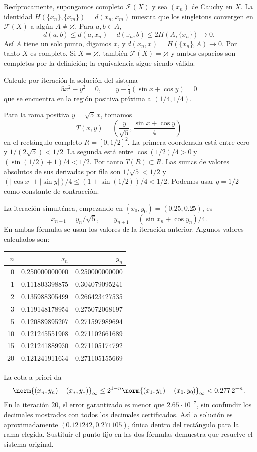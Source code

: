 \begin{solucion}
Recíprocamente, supongamos completo $\mathcal F(X)$ y sea $(x_n)$ de Cauchy en $X$. La identidad $H(\{x_n\},\{x_m\})=d(x_n,x_m)$ muestra que los singletons convergen en $\mathcal F(X)$ a algún $A\ne\varnothing$. Para $a,b\in A$,
\[
 d(a,b)\leq d(a,x_n)+d(x_n,b)\leq2H(A,\{x_n\})\longrightarrow0.
\]
Así $A$ tiene un solo punto, digamos $x$, y $d(x_n,x)=H(\{x_n\},A)\to0$. Por tanto $X$ es completo. Si $X=\varnothing$, también $\mathcal F(X)=\varnothing$ y ambos espacios son completos por la definición; la equivalencia sigue siendo válida.
\end{solucion}

\begin{ejercicio}\label{ej:lectura-11-6}
Calcule por iteración la solución del sistema
\[
 5x^2-y^2=0,\qquad y-\tfrac14(\sin x+\cos y)=0
\]
que se encuentra en la región positiva próxima a $(1/4,1/4)$.
\end{ejercicio}
\begin{solucion}
Para la rama positiva $y=\sqrt5\,x$, tomamos
\[
 T(x,y)=\left(\frac{y}{\sqrt5},\frac{\sin x+\cos y}{4}\right)
\]
en el rectángulo completo $R=[0,1/2]^2$. La primera coordenada está entre cero y $1/(2\sqrt5)<1/2$. La segunda está entre $\cos(1/2)/4>0$ y $(\sin(1/2)+1)/4<1/2$. Por tanto $T(R)\subset R$. Las sumas de valores absolutos de sus derivadas por fila son $1/\sqrt5<1/2$ y $(|\cos x|+|\sin y|)/4\leq(1+\sin(1/2))/4<1/2$. Podemos usar $q=1/2$ como constante de contracción.

La iteración simultánea, empezando en $(x_0,y_0)=(0.25,0.25)$, es
\[
 x_{n+1}=y_n/\sqrt5,\qquad y_{n+1}=(\sin x_n+\cos y_n)/4.
\]
En ambas fórmulas se usan los valores de la iteración anterior. Algunos valores calculados son:
\begin{center}
\begin{tabular}{rrr}
\toprule
$n$&$x_n$&$y_n$\\\midrule
0&0.250000000000&0.250000000000\\
1&0.111803398875&0.304079095241\\
2&0.135988305499&0.266423427535\\
3&0.119148178954&0.275072068197\\
5&0.120889895207&0.271597989694\\
10&0.121245551908&0.271102661689\\
15&0.121241889930&0.271105174792\\
20&0.121241911634&0.271105155669\\\bottomrule
\end{tabular}
\end{center}
La cota a priori da
\[
 \norm{(x_n,y_n)-(x_*,y_*)}_\infty
 \leq 2^{1-n}\norm{(x_1,y_1)-(x_0,y_0)}_\infty
 <0.277\,2^{-n}.
\]
En la iteración $20$, el error garantizado es menor que $2.65\cdot10^{-7}$, sin confundir los decimales mostrados con todos los decimales certificados. Así la solución es aproximadamente $(0.121242,0.271105)$, única dentro del rectángulo para la rama elegida. Sustituir el punto fijo en las dos fórmulas demuestra que resuelve el sistema original.
\end{solucion}

